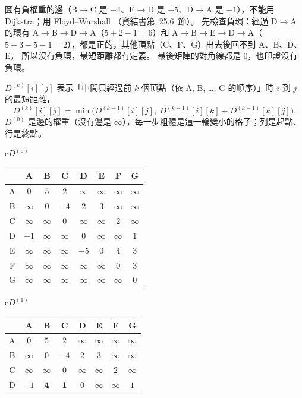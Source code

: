 \begin{pastsoln}
圖有負權重的邊（B$\to$C 是 $-4$、E$\to$D 是 $-5$、D$\to$A 是 $-1$），不能用 Dijkstra；用 Floyd--Warshall
（資結書第~25.6~節）。 先檢查負環：經過 D$\to$A 的環有 A$\to$B$\to$D$\to$A（$5 + 2 - 1 = 6$）和
A$\to$B$\to$E$\to$D$\to$A（$5 + 3 - 5 - 1 = 2$），都是正的，其他頂點（C、F、G）出去後回不到 A、B、D、E，
所以沒有負環，最短距離都有定義。 最後矩陣的對角線都是 $0$，也印證沒有負環。

$D^{(k)}[i][j]$ 表示「中間只經過前 $k$ 個頂點（依 A, B, \ldots, G 的順序）」時 $i$ 到 $j$ 的最短距離，
\[
D^{(k)}[i][j] = \min\bigl(D^{(k-1)}[i][j],\ D^{(k-1)}[i][k] + D^{(k-1)}[k][j]\bigr).
\]
$D^{(0)}$ 是邊的權重（沒有邊是 $\infty$），每一步粗體是這一輪變小的格子；列是起點、行是終點。

\begin{center}\small
\begin{tabular}[t]{c}$D^{(0)}$\\[2pt]
\begin{tabular}{c|*{7}{c}}
 & A & B & C & D & E & F & G \\ \hline
A & $0$ & $5$ & $2$ & $\infty$ & $\infty$ & $\infty$ & $\infty$ \\
B & $\infty$ & $0$ & $-4$ & $2$ & $3$ & $\infty$ & $\infty$ \\
C & $\infty$ & $\infty$ & $0$ & $\infty$ & $\infty$ & $2$ & $\infty$ \\
D & $-1$ & $\infty$ & $\infty$ & $0$ & $\infty$ & $\infty$ & $1$ \\
E & $\infty$ & $\infty$ & $\infty$ & $-5$ & $0$ & $4$ & $3$ \\
F & $\infty$ & $\infty$ & $\infty$ & $\infty$ & $\infty$ & $0$ & $3$ \\
G & $\infty$ & $\infty$ & $\infty$ & $\infty$ & $\infty$ & $\infty$ & $0$ \\
\end{tabular}
\end{tabular}\qquad
\begin{tabular}[t]{c}$D^{(1)}$\\[2pt]
\begin{tabular}{c|*{7}{c}}
 & A & B & C & D & E & F & G \\ \hline
A & $0$ & $5$ & $2$ & $\infty$ & $\infty$ & $\infty$ & $\infty$ \\
B & $\infty$ & $0$ & $-4$ & $2$ & $3$ & $\infty$ & $\infty$ \\
C & $\infty$ & $\infty$ & $0$ & $\infty$ & $\infty$ & $2$ & $\infty$ \\
D & $-1$ & \textbf{4} & \textbf{1} & $0$ & $\infty$ & $\infty$ & $1$ \\

\end{tabular}
\end{tabular}
\end{center}
\end{pastsoln}

